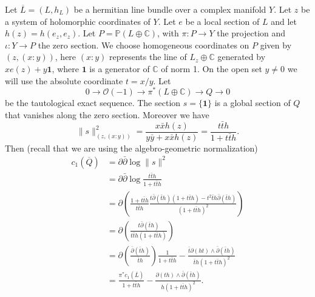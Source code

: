 \documentclass[10pt,twoside]{article}
\numberwithin{equation}{section}
\theoremstyle{plain}
\theoremstyle{definition}
\begin{document}
Let $\overline L=(L,h_{L})$ be a hermitian line bundle over a complex  manifold
$Y$. Let $z$ be a system of holomorphic coordinates of $Y$. Let $e$ be a 
local section of $L$ and let $h(z)=h(e_{z},e_{z})$. Let
$P=\mathbb{P}(L\oplus 
\mathbb{C})$, with $\pi \colon P\longrightarrow Y$ the projection and
$\iota\colon Y\longrightarrow P$ the zero section. We choose homogeneous
coordinates on $P$ given by 
$(z,(x:y))$, here $(x:y)$ represents
the line of $L_{z}\oplus \mathbb{C}$ generated by $xe(z)+y\mathbf{1}$,
where $\mathbf{1}$ is a generator of $\mathbb{C}$ of norm 1. On the
open set $y\not =0$ we will use the absolute coordinate $t=x/y$. Let
\begin{displaymath}
  0\longrightarrow \mathcal{O}(-1)\longrightarrow 
  \pi ^{\ast}(L\oplus \mathbb{C})\longrightarrow Q\longrightarrow 0
\end{displaymath}
be the tautological exact sequence. The section $s=\{\mathbf{1}\}$ is a
global section of $Q$ that vanishes along the zero section. Moreover
we have
\begin{displaymath}
  \|s\|^{2}_{(z,(x:y))}=\frac{x\bar x h(z)}{y\bar y+
x\bar x h(z)}=\frac{t\bar t h}{1+
t\bar t h}.
\end{displaymath}
Then (recall that we are using the algebro-geometric normalization)
\begin{align}
  c_{1}(\overline Q)&=\partial\bar {\partial}\log  \|s\|^{2}\\
  &=\partial\bar {\partial}\log \frac{t\bar t h}{1+
t\bar t h}\\
&=\partial\left(
  \frac{1+t\bar th}{t\bar th}
  \frac{t\bar\partial(\bar th)(1+t\bar t h)-t^{2}\bar t
    h\bar \partial(\bar t h)}{(1+t\bar t h)^{2}}
  \right)\\
&=\partial\left(\frac{t\bar\partial (\bar t h)}{t\bar t h(1+t\bar t h)}
  \right)\\
&=\partial\left(\frac{\bar \partial(\bar t h)}{\bar t h}
\right)\frac{1}{1+t\bar t h}-\frac{\bar t \partial(ht)\land
  \bar \partial(\bar t h)}{\bar t h(1+t\bar t h)^{2}}\\
&=\frac{\pi ^{\ast}c_{1}(\overline L)}{1+t\bar t h}-
\frac{\partial(th)\land
  \bar \partial(\bar t h)}{h(1+t\bar t h)^{2}}.
\end{align}
\end{document}
